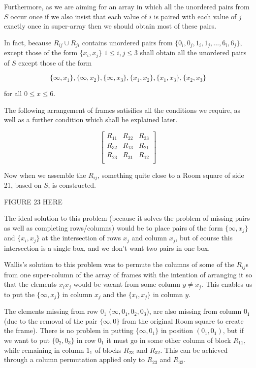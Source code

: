 \documentclass[
  11pt,
  a4paper]{book}\usepackage[]{graphicx}\usepackage[]{xcolor}
\newcounter{example}
\begin{document}
\begin{example}
Furthermore, as we are aiming for an array in which all the
unordered pairs from $S$ occur once if we also insist that
each value of $i$ is paired with each value of $j$ exactly
once in super-array then we should obtain most of these
pairs.

In fact, because $R_{ij} \cup R_{ji}$ contains
unordered pairs from $\{0_i,0_j,1_i,1_j,...,6_i,6_j\}$,
except those of the form $\{x_i,x_j\}$ $1 \leq i,j \leq 3$
shall obtain all the unordered pairs of $S$ except those of
the form

\begin{equation}
\{\infty, x_1\}, \{\infty, x_2\}, \{\infty, x_3\}, \{x_1, x_2\}, \{x_1, x_3\}, \{x_2, x_3\}
\end{equation}

for all $0 \leq x \leq 6$.

The following arrangement of frames satisifies all the
conditions we require, as well as a further condition which
shall be explained later.

\begin{equation}
  \begin{bmatrix}
    R_{11} & R_{22} & R_{33} \\
    R_{32} & R_{13} & R_{21} \\
    R_{23} & R_{31} & R_{12} \\
  \end{bmatrix}
\end{equation}

Now when we assemble the $R_{ij}$, something quite close to
a Room square of side 21, based on $S$, is constructed.

FIGURE 23 HERE

\end{example}

The ideal solution to this problem
(because it solves the problem of missing pairs as well as
completing rows/columns) would be to place pairs of the form
$\{\infty, x_j\}$ and $\{x_i, x_j\}$ at the intersection of
rows $x_j$ and column $x_j$, but of course this intersection
is a single box, and we don’t want two pairs in one box.

Wallis’s solution to this problem was to permute the columns
of some of the $R_{ij}$s from one super-column of the array
of frames with the intention of arranging it so that the
elements $x_i x_j$ would be vacant from some column
$y \neq x_j$. This enables us to put the $\{\infty, x_j\}$ in
column $x_j$ and the $\{x_i,x_j\}$ in column $y$.

The elements missing from row $0_1$ ($\infty, 0_1, 0_2, 0_3$),
are also missing from column $0_1$ (due to the removal
of the pair $\{\infty,0\}$ from the original Room square to
create the frame). There is no problem in putting
$\{\infty,0_1\}$ in position $(0_1,0_1)$, but if we want to
put $\{0_2,0_3\}$ in row $0_1$ it must go in some other
column of block $R_{11}$, while remaining in column $1_1$ of
blocks $R_{23}$ and $R_{32}$. This can be achieved through a
column permutation applied only to $R_{23}$ and $R_{32}$.
\end{document}
